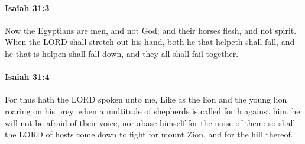 		\paragraph{Isaiah 31:3} %
			\label{ISAIAH-31-3}

			Now the Egyptians are men, and not God; and their horses flesh, and not spirit. When the LORD shall stretch out his hand, both he that helpeth shall fall, and he that is holpen shall fall down, and they all shall fail together.


		\paragraph{Isaiah 31:4} %
			\label{ISAIAH-31-4}

			For thus hath the LORD spoken unto me, Like as the lion and the young lion roaring on his prey, when a multitude of shepherds is called forth against him, he will not be afraid of their voice, nor abase himself for the noise of them: so shall the LORD of hosts come down to fight for mount Zion, and for the hill thereof.

